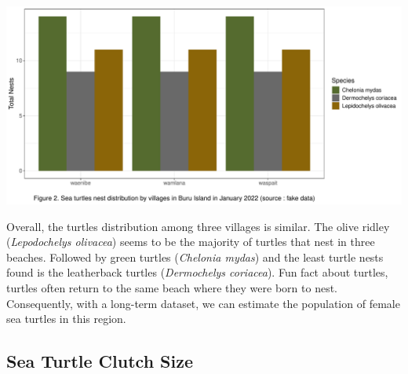 \documentclass[
]{article}
\begin{document}
\begin{center}\includegraphics{../output/nest_distribution-1} \end{center}

Overall, the turtles distribution among three villages is similar. The
olive ridley (\emph{Lepodochelys olivacea}) seems to be the majority of
turtles that nest in three beaches. Followed by green turtles
(\emph{Chelonia mydas}) and the least turtle nests found is the
leatherback turtles (\emph{Dermochelys coriacea}). Fun fact about
turtles, turtles often return to the same beach where they were born to
nest. Consequently, with a long-term dataset, we can estimate the
population of female sea turtles in this region.

\hypertarget{sea-turtle-clutch-size}{%
\subsection{Sea Turtle Clutch Size}\label{sea-turtle-clutch-size}}
\end{document}
